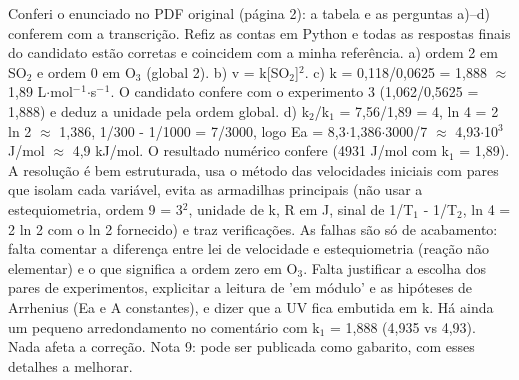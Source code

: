 \documentclass{article}%
\begin{document}
Conferi o enunciado no PDF original (página 2): a tabela e as perguntas a)--d) conferem com a transcrição. Refiz as contas em Python e todas as respostas finais do candidato estão corretas e coincidem com a minha referência. a) ordem 2 em SO$_{2}$ e ordem 0 em O$_{3}$ (global 2). b) v = k{[}SO$_{2}${]}$^2$. c) k = 0,118/0,0625 = 1,888 $\approx$ 1,89 L$\cdot$mol$^{-}$$^{1}$$\cdot$s$^{-}$$^{1}$. O candidato confere com o experimento 3 (1,062/0,5625 = 1,888) e deduz a unidade pela ordem global. d) k$_{2}$/k$_{1}$ = 7,56/1,89 = 4, ln 4 = 2 ln 2 $\approx$ 1,386, 1/300 - 1/1000 = 7/3000, logo Ea = 8,3$\cdot$1,386$\cdot$3000/7 $\approx$ 4,93$\cdot$10$^3$ J/mol $\approx$ 4,9 kJ/mol. O resultado numérico confere (4931 J/mol com k$_{1}$ = 1,89). A resolução é bem estruturada, usa o método das velocidades iniciais com pares que isolam cada variável, evita as armadilhas principais (não usar a estequiometria, ordem 9 = 3$^2$, unidade de k, R em J, sinal de 1/T$_{1}$ - 1/T$_{2}$, ln 4 = 2 ln 2 com o ln 2 fornecido) e traz verificações. As falhas são só de acabamento: falta comentar a diferença entre lei de velocidade e estequiometria (reação não elementar) e o que significa a ordem zero em O$_{3}$. Falta justificar a escolha dos pares de experimentos, explicitar a leitura de 'em módulo' e as hipóteses de Arrhenius (Ea e A constantes), e dizer que a UV fica embutida em k. Há ainda um pequeno arredondamento no comentário com k$_{1}$ = 1,888 (4,935 vs 4,93). Nada afeta a correção. Nota 9: pode ser publicada como gabarito, com esses detalhes a melhorar.%
$$
\end{document}
